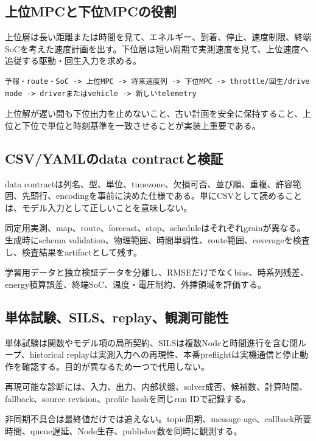 \documentclass[a4paper,11pt]{article}
\begin{document}
\subsection{上位MPCと下位MPCの役割}
上位層は長い距離または時間を見て、エネルギー、到着、停止、速度制限、終端SoCを考えた速度計画を出す。下位層は短い周期で実測速度を見て、上位速度へ追従する駆動・回生入力を求める。


\begin{lstlisting}
予報・route・SoC -> 上位MPC -> 将来速度列 -> 下位MPC -> throttle/回生/drive mode -> driverまたはvehicle -> 新しいtelemetry
\end{lstlisting}


上位解が遅い間も下位出力を止めないこと、古い計画を安全に保持すること、上位と下位で単位と時刻基準を一致させることが実装上重要である。



\subsection{CSV/YAMLのdata contractと検証}
data contractは列名、型、単位、timezone、欠損可否、並び順、重複、許容範囲、先頭行、encodingを事前に決めた仕様である。単にCSVとして読めることは、モデル入力として正しいことを意味しない。


同定用実測、map、route、forecast、stop、scheduleはそれぞれgrainが異なる。生成時にschema validation、物理範囲、時間単調性、route範囲、coverageを検査し、検査結果をartifactとして残す。


学習用データと独立検証データを分離し、RMSEだけでなくbias、時系列残差、energy積算誤差、終端SoC、温度・電圧制約、外挿領域を評価する。



\subsection{単体試験、SILS、replay、観測可能性}
単体試験は関数やモデル項の局所契約、SILSは複数Nodeと時間進行を含む閉ループ、historical replayは実測入力への再現性、本番preflightは実機通信と停止動作を確認する。目的が異なるため一つで代用しない。


再現可能な診断には、入力、出力、内部状態、solver成否、候補数、計算時間、fallback、source revision、profile hashを同じrun IDで記録する。


非同期不具合は最終値だけでは追えない。topic周期、message age、callback所要時間、queue遅延、Node生存、publisher数を同時に観測する。
\end{document}
